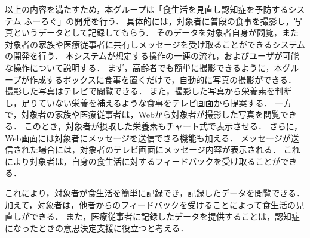 \documentclass[../report]{subfiles}
\begin{document}
以上の内容を満たすため，本グループは「食生活を見直し認知症を予防するシステム ふーろぐ」の開発を行う．
具体的には，対象者に普段の食事を撮影し，写真というデータとして記録してもらう．
そのデータを対象者自身が閲覧，また対象者の家族や医療従事者に共有しメッセージを受け取ることができるシステムの開発を行う．
本システムが想定する操作の一連の流れ，およびユーザが可能な操作について説明する．
まず，高齢者でも簡単に撮影できるように，本グループが作成するボックスに食事を置くだけで，自動的に写真の撮影ができる．
撮影した写真はテレビで閲覧できる．
また，撮影した写真から栄養素を判断し，足りていない栄養を補えるような食事をテレビ画面から提案する．
一方で，対象者の家族や医療従事者は，Webから対象者が撮影した写真を閲覧できる．
このとき，対象者が摂取した栄養素もチャート式で表示させる．
さらに，Web画面には対象者にメッセージを送信できる機能も加える．
メッセージが送信された場合には，対象者のテレビ画面にメッセージ内容が表示される．
これにより対象者は，自身の食生活に対するフィードバックを受け取ることができる．

これにより，対象者が食生活を簡単に記録でき，記録したデータを閲覧できる．加えて，対象者は，他者からのフィードバックを受けることによって食生活の見直しができる．
また，医療従事者に記録したデータを提供することは，認知症になったときの意思決定支援に役立つと考える．
\end{document}
